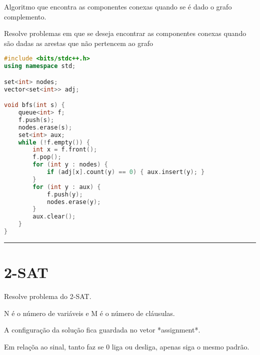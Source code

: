 \documentclass[11pt, a4paper, twoside]{book}
\begin{document}
Algoritmo que encontra as componentes conexas quando se é dado o grafo complemento.



Resolve problemas em que se deseja encontrar as componentes conexas quando são dadas as arestas que não pertencem ao grafo




\hfill

\begin{lstlisting}[language=C++]
#include <bits/stdc++.h>
using namespace std;

set<int> nodes;
vector<set<int>> adj;

void bfs(int s) {
    queue<int> f;
    f.push(s);
    nodes.erase(s);
    set<int> aux;
    while (!f.empty()) {
        int x = f.front();
        f.pop();
        for (int y : nodes) {
            if (adj[x].count(y) == 0) { aux.insert(y); }
        }
        for (int y : aux) {
            f.push(y);
            nodes.erase(y);
        }
        aux.clear();
    }
}
\end{lstlisting}

\hfill

\rule{\textwidth}{0.4pt}

\section{2-SAT}



Resolve problema do 2-SAT.





N é o número de variáveis e M é o número de cláusulas.  

A configuração da solução fica guardada no vetor *assignment*. 



Em relaçõa ao sinal, tanto faz se 0 liga ou desliga, apenas siga o mesmo padrão.


\hfill
\end{document}
